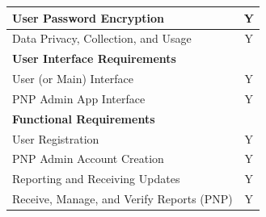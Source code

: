 \begin{table}[]
\begin{tabular}{|lc|}
\multicolumn{1}{|l|}{User Password Encryption}                                                                                                                      & Y                                                                     \\ \hline
\multicolumn{1}{|l|}{Data Privacy, Collection, and Usage}                                                                                                           & Y                                                                     \\ \hline
\multicolumn{2}{|l|}{\textbf{User Interface Requirements}}                                                                                                                                                                                  \\ \hline
\multicolumn{1}{|l|}{User (or Main) Interface}                                                                                                                      & Y                                                                     \\ \hline
\multicolumn{1}{|l|}{PNP Admin App Interface}                                                                                                                       & Y                                                                     \\ \hline
\multicolumn{2}{|l|}{\textbf{Functional Requirements}}                                                                                                                                                                                      \\ \hline
\multicolumn{1}{|l|}{User Registration}                                                                                                                             & Y                                                                     \\ \hline
\multicolumn{1}{|l|}{PNP Admin Account Creation}                                                                                                                    & Y                                                                     \\ \hline
\multicolumn{1}{|l|}{Reporting and Receiving Updates}                                                                                                               & Y                                                                     \\ \hline
\multicolumn{1}{|l|}{Receive, Manage, and Verify Reports (PNP)}                                                                                                     & Y                                                                     \\ \hline

\end{tabular}
\end{table}
